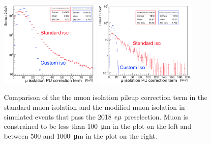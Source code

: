 \begin{figure}
\centering
\includegraphics[width=0.44\textwidth]{figures/selection/CustomVsStandardMuIsoPUcorrection_2018emuTTbar_PCR.png}
\includegraphics[width=0.45\textwidth]{figures/selection/CustomVsStandardMuIsoPUcorrection_2018emuTTbar_500To1000um.png}
\caption{Comparison of the the muon isolation pileup correction term in the standard muon isolation and the modified muon isolation in simulated \ttbar events that pass the 2018 $e{\mu}$ preselection. Muon \ad is constrained to be less than \SI{100}{\um} in the plot on the left and between \num{500} and \SI{1000}{\um} in the plot on the right.}
\label{iso_pu_term_comparison}
\end{figure}

